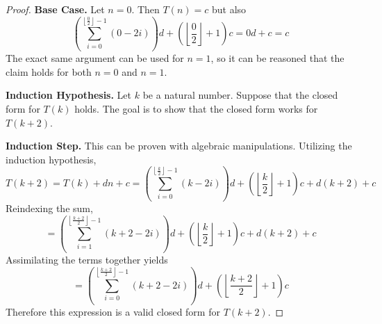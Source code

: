 \documentclass[11pt]{article}
\begin{document}
\begin{enumerate}
\begin{proof}
            \textbf{Base Case.} Let \(n=0\). Then \(T(n) = c\) but also
            \[
                \left(\sum_{i=0}^{\left\lfloor \frac{0}{2} \right\rfloor - 1} (0-2i)\right) d + \left(\left\lfloor\frac{0}{2}\right\rfloor + 1\right) c = 0d + c = c
            \]
            The exact same argument can be used for \(n=1\), so it can be reasoned that the claim holds for both \(n=0\) and \(n=1\).

            \textbf{Induction Hypothesis.} Let \(k\) be a natural number. Suppose that the closed form for \(T(k)\) holds. The goal is to show that the closed form works for \(T(k+2)\).

            \textbf{Induction Step.} This can be proven with algebraic manipulations. Utilizing the induction hypothesis,
            \[
                T(k+2) = T(k) + dn + c = \left(\sum_{i=0}^{\left\lfloor \frac{k}{2} \right\rfloor - 1} (k-2i)\right) d + \left(\left\lfloor\frac{k}{2}\right\rfloor + 1\right) c +d(k+2) + c
            \]
            Reindexing the sum,
            \[
                = \left(\sum_{i=1}^{\left\lfloor \frac{k+2}{2} \right\rfloor - 1} (k+2-2i)\right) d + \left(\left\lfloor\frac{k}{2}\right\rfloor + 1\right) c +d(k+2) + c
            \]
            Assimilating the terms together yields
            \[
                = \left(\sum_{i=0}^{\left\lfloor \frac{k+2}{2} \right\rfloor - 1} (k+2-2i)\right) d + \left( \left\lfloor \frac{k+2}{2} \right\rfloor + 1\right) c
            \]
            Therefore this expression is a valid closed form for \(T(k+2)\).
            

\end{proof}
\end{enumerate}
\end{document}

